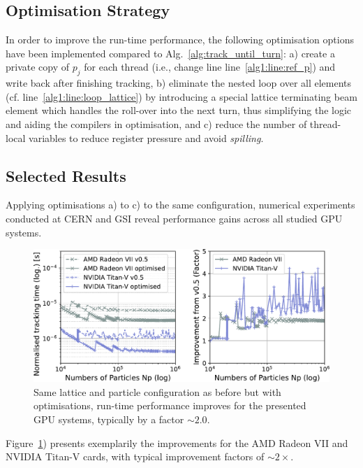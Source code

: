 \documentclass[a4paper,
               refpage,       %
               keeplastbox,   %
               ]{jacow}
\begin{document}
\subsection{Optimisation Strategy}
In order to improve the run-time performance, the following optimisation options have been implemented compared to %
Alg.~\ref{alg:track_until_turn}:
a) create a private copy of $p_j$ for each thread (i.e., change line line~\ref{alg1:line:ref_p}) and write back after finishing tracking, b) eliminate the nested loop over all elements (cf. line~\ref{alg1:line:loop_lattice}) by introducing a special lattice terminating beam element which handles the roll-over into the next turn, thus simplifying the logic and aiding the compilers in optimisation, and c) reduce the number of thread-local variables to reduce register pressure and avoid \textit{spilling}.
\subsection{Selected Results}
Applying optimisations a) to c) to the same configuration, numerical experiments conducted at CERN and GSI reveal performance gains across all studied GPU systems.
\begin{figure}[h!bt]
    \centering 
    \includegraphics*[width=\columnwidth]{fig_performance_optimisation}
    \caption{Same lattice and particle configuration as before but with optimisations, run-time performance improves for the presented GPU systems, typically by a factor $\sim 2.0$.}
    \label{fig:optimised_performance}
\end{figure}
Figure~\ref{fig:optimised_performance}) presents exemplarily the improvements for the AMD Radeon VII and NVIDIA Titan-V cards, with typical improvement factors of $\sim 2\times$\cite{data-2021}. 
\end{document}
